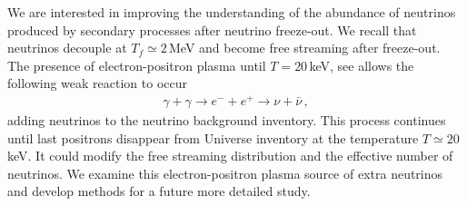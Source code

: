 We are interested in improving the understanding of the abundance of neutrinos produced by secondary processes after neutrino  freeze-out. We recall that neutrinos decouple at $T_f\simeq 2$\,MeV and become free streaming after freeze-out. The presence of electron-positron plasma until $T=20$\,keV, see  allows the following weak reaction to occur 
\begin{align}
\gamma+\gamma\longrightarrow e^-+e^+\longrightarrow \nu+\bar{\nu}\,,
\end{align}
adding neutrinos to the neutrino background inventory. This process continues until last positrons disappear from Universe inventory at the temperature $T\simeq 20$\,keV. It could modify the free streaming distribution and the effective number of neutrinos. We examine this electron-positron plasma source of extra neutrinos and develop methods for a
future more detailed study.

